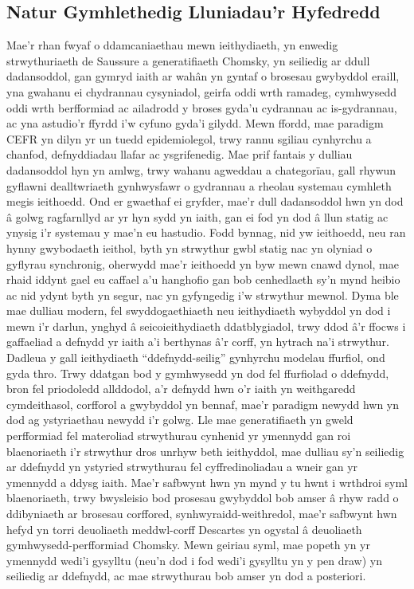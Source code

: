 \subsection{Natur Gymhlethedig Lluniadau'r Hyfedredd}
Mae'r rhan fwyaf o ddamcaniaethau mewn ieithydiaeth, yn enwedig strwythuriaeth de Saussure a generatifiaeth Chomsky, yn seiliedig ar ddull dadansoddol, gan gymryd iaith ar wahân yn gyntaf o brosesau gwybyddol eraill, yna gwahanu ei chydrannau cysyniadol, geirfa oddi wrth ramadeg, cymhwysedd oddi wrth berfformiad \parencite{chomsky_aspects_1965} ac ailadrodd y broses gyda'u cydrannau ac is-gydrannau, ac yna astudio'r ffyrdd i'w cyfuno gyda'i gilydd. Mewn ffordd, mae paradigm CEFR yn dilyn yr un tuedd epidemiolegol, trwy rannu sgiliau cynhyrchu a chanfod, defnyddiadau llafar ac ysgrifenedig. Mae prif fantais y dulliau dadansoddol hyn yn amlwg, trwy wahanu agweddau a chategorïau, gall rhywun gyflawni dealltwriaeth gynhwysfawr o gydrannau a rheolau systemau cymhleth megis ieithoedd. Ond er gwaethaf ei gryfder, mae'r dull dadansoddol hwn yn dod â golwg ragfarnllyd ar yr hyn sydd yn iaith, gan ei fod yn dod â llun statig ac ynysig i'r systemau y mae'n eu hastudio. Fodd bynnag, nid yw ieithoedd, neu ran hynny gwybodaeth ieithol, byth yn strwythur gwbl statig nac yn olyniad o gyflyrau synchronig, oherwydd mae'r ieithoedd yn byw mewn cnawd dynol, mae rhaid iddynt gael eu caffael a'u hanghofio gan bob cenhedlaeth sy'n mynd heibio ac nid ydynt byth yn segur, nac yn gyfyngedig i'w strwythur mewnol. Dyma ble mae dulliau modern, fel swyddogaethiaeth neu ieithydiaeth wybyddol \textcite{evans_cognitive_2009} yn dod i mewn i'r darlun, ynghyd â seicoieithydiaeth ddatblygiadol, trwy ddod â'r ffocws i gaffaeliad a defnydd yr iaith a'i berthynas â'r corff, yn hytrach na'i strwythur. Dadleua \textcite{bybee_usage-based_1999} y gall ieithydiaeth ``ddefnydd-seilig'' gynhyrchu modelau ffurfiol, ond gyda thro. Trwy ddatgan bod y gymhwysedd yn dod fel ffurfiolad o ddefnydd, bron fel priodoledd allddodol, a'r defnydd hwn o'r iaith yn weithgaredd cymdeithasol, corfforol a gwybyddol yn bennaf, mae'r paradigm newydd hwn yn dod ag ystyriaethau newydd i'r golwg. Lle mae generatifiaeth yn gweld perfformiad fel materoliad strwythurau cynhenid yr ymennydd gan roi blaenoriaeth i'r strwythur dros unrhyw beth ieithyddol, mae dulliau sy'n seiliedig ar ddefnydd yn ystyried strwythurau fel cyffredinoliadau a wneir gan yr ymennydd a ddysg iaith. Mae'r safbwynt hwn yn mynd y tu hwnt i wrthdroi syml blaenoriaeth, trwy bwysleisio bod prosesau gwybyddol bob amser â rhyw radd o ddibyniaeth ar brosesau corffored, synhwyraidd-weithredol, mae'r safbwynt hwn hefyd yn torri deuoliaeth meddwl-corff Descartes \parencite{varela_embodied_1991} yn ogystal â deuoliaeth gymhwysedd-perfformiad Chomsky. Mewn geiriau syml, mae popeth yn yr ymennydd wedi'i gysylltu (neu'n dod i fod wedi'i gysylltu yn y pen draw) yn seiliedig ar ddefnydd, ac mae strwythurau bob amser yn dod a posteriori.

